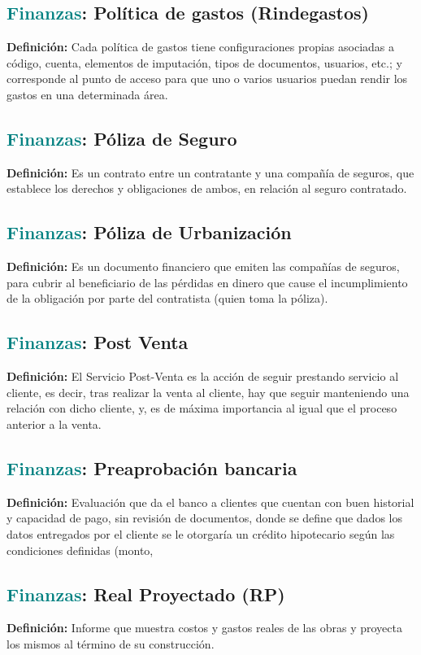 \documentclass[12pt]{article}
\begin{document}
\subsection{\textcolor{teal}{Finanzas}: Política de gastos (Rindegastos)}
\textbf{Definición:} Cada política de gastos tiene configuraciones propias asociadas a código, cuenta, elementos de imputación, tipos de documentos, usuarios, etc.; y corresponde al punto de acceso para que uno o varios usuarios puedan rendir los gastos en una determinada área.
\subsection{\textcolor{teal}{Finanzas}: Póliza de Seguro}
\textbf{Definición:} Es un contrato entre un contratante y una compañía de seguros, que establece los derechos y obligaciones de ambos, en relación al seguro contratado.
\subsection{\textcolor{teal}{Finanzas}: Póliza de Urbanización}
\textbf{Definición:} Es un documento financiero que emiten las compañías de seguros, para cubrir al beneficiario de las pérdidas en dinero que cause el incumplimiento de la obligación por parte del contratista (quien toma la póliza).
\subsection{\textcolor{teal}{Finanzas}: Post Venta}
\textbf{Definición:} El Servicio Post-Venta es la acción de seguir prestando servicio al cliente, es decir, tras realizar la venta al cliente, hay que seguir manteniendo una relación con dicho cliente, y, es de máxima importancia al igual que el proceso anterior a la venta.
\subsection{\textcolor{teal}{Finanzas}: Preaprobación bancaria}
\textbf{Definición:} Evaluación que da el banco a clientes que cuentan con buen historial y capacidad de pago, sin revisión de documentos, donde se define que dados los datos entregados por el cliente se le otorgaría un crédito hipotecario según las condiciones definidas (monto, %
\subsection{\textcolor{teal}{Finanzas}: Real Proyectado (RP)}
\textbf{Definición:} Informe que muestra costos y gastos reales de las obras y proyecta los mismos al término de su construcción.
\end{document}
